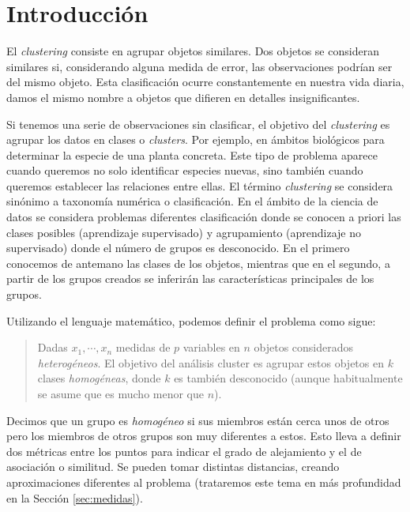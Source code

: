 \documentclass[a4paper, 20pt]{article}
\begin{document}
{\parskip=2pt
  \tableofcontents
}
\pagebreak

\section{Introducción}

El \textit{clustering} consiste en agrupar objetos similares. Dos objetos se consideran similares si, considerando alguna medida de error, las observaciones podrían ser del mismo objeto. Esta clasificación ocurre constantemente en nuestra vida diaria, damos el mismo nombre a objetos que difieren en detalles insignificantes. 


Si tenemos una serie de observaciones sin clasificar, el objetivo del \textit{clustering} es agrupar los datos en clases o \textit{clusters}. Por ejemplo, en ámbitos biológicos para determinar la especie de una planta concreta. Este tipo de problema aparece cuando queremos no solo identificar especies nuevas, sino también cuando queremos establecer las relaciones entre ellas. El término \textit{clustering} se considera sinónimo a taxonomía numérica o clasificación. En el ámbito de la ciencia de datos se considera problemas diferentes clasificación donde se conocen a priori las clases posibles (aprendizaje supervisado) y agrupamiento (aprendizaje no supervisado) donde el número de grupos es desconocido. En el primero conocemos de antemano las clases de los objetos, mientras que en el segundo, a partir de los grupos creados se inferirán las características principales de los grupos.

Utilizando el lenguaje matemático, podemos definir el problema como sigue:

\begin{quote}
  Dadas \textbf{$x_1$}$,\cdots, $\textbf{$x_n$} medidas de $p$ variables en $n$ objetos considerados \textit{heterogéneos}. El objetivo del análisis cluster es agrupar estos objetos en $k$ clases \textit{homogéneas}, donde $k$ es también desconocido (aunque habitualmente se asume que es mucho menor que $n$).
\end{quote}

Decimos que un grupo es \textit{homogéneo} si sus miembros están cerca unos de otros pero los miembros de otros grupos son muy diferentes a estos. Esto lleva a definir dos métricas entre los puntos para indicar el grado de alejamiento y el de asociación o similitud. Se pueden tomar distintas distancias, creando aproximaciones diferentes al problema (trataremos este tema en más profundidad en la Sección \ref{sec:medidas}).
\end{document}
